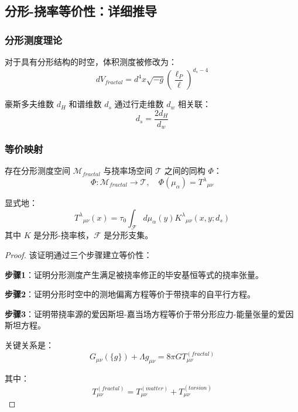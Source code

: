 \subsection{分形-挠率等价性：详细推导}
\label{sec:fractal_torsion_detail}

\subsubsection{分形测度理论}

对于具有分形结构的时空，体积测度被修改为：
\begin{equation}
    dV_{fractal} = d^4x \sqrt{-g} \left(\frac{\ell_P}{\ell}\right)^{d_s - 4}
\end{equation}

豪斯多夫维数 $d_H$ 和谱维数 $d_s$ 通过行走维数 $d_w$ 相关联：
\begin{equation}
    d_s = \frac{2d_H}{d_w}
\end{equation}

\subsubsection{等价映射}

\begin{theorem}
存在分形测度空间 $\mathcal{M}_{fractal}$ 与挠率场空间 $\mathcal{T}$ 之间的同构 $\Phi$：
\begin{equation}
    \Phi: \mathcal{M}_{fractal} \to \mathcal{T}, \quad \Phi(\mu_{\alpha}) = T^{\lambda}{}_{\mu\nu}
\end{equation}

显式地：
\begin{equation}
    T^{\lambda}{}_{\mu\nu}(x) = \tau_0 \int_{\mathcal{F}} d\mu_{\alpha}(y) K^{\lambda}{}_{\mu\nu}(x, y; d_s)
\end{equation}
其中 $K$ 是分形-挠率核，$\mathcal{F}$ 是分形支集。
\end{theorem}

\begin{proof}
该证明通过三个步骤建立等价性：

\textbf{步骤1}：证明分形测度产生满足被挠率修正的毕安基恒等式的挠率张量。

\textbf{步骤2}：证明分形时空中的测地偏离方程等价于带挠率的自平行方程。

\textbf{步骤3}：证明带挠率源的爱因斯坦-嘉当场方程等价于带分形应力-能量张量的爱因斯坦方程。

关键关系是：
\begin{equation}
    G_{\mu\nu}(\{g\}) + \Lambda g_{\mu\nu} = 8\pi G T_{\mu\nu}^{(fractal)}
\end{equation}

其中：
\begin{equation}
    T_{\mu\nu}^{(fractal)} = T_{\mu\nu}^{(matter)} + T_{\mu\nu}^{(torsion)}
\end{equation}
\end{proof}

